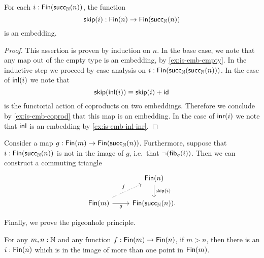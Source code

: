 \begin{lem}
  For each $i:\mathsf{Fin}(\mathsf{succ}_{{\mathbb{N}}}(n))$, the function
  \begin{equation*}
    \mathsf{skip}(i):\mathsf{Fin}(n)\to\mathsf{Fin}(\mathsf{succ}_{{\mathbb{N}}}(n))
  \end{equation*}
  is an embedding.
\end{lem}

\begin{proof}
  This assertion is proven by induction on $n$. In the base case, we note that any map out of the empty type is an embedding, by \cref{ex:is-emb-empty}. In the inductive step we proceed by case analysis on $i:\mathsf{Fin}(\mathsf{succ}_{{\mathbb{N}}}(\mathsf{succ}_{{\mathbb{N}}}(n)))$. In the case of ${\mathsf{inl}}(i)$ we note that
  \begin{equation*}
    \mathsf{skip}({\mathsf{inl}}(i))\equiv \mathsf{skip}(i)+\mathsf{id}_{}
  \end{equation*}
  is the functorial action of coproducts on two embeddings. Therefore we conclude by \cref{ex:is-emb-coprod} that this map is an embedding. In the case of ${\mathsf{inr}}(i)$ we note that ${\mathsf{inl}}$ is an embedding by \cref{ex:is-emb-inl-inr}.
\end{proof}

\begin{lem}
  Consider a map $g:\mathsf{Fin}(m)\to\mathsf{Fin}(\mathsf{succ}_{{\mathbb{N}}}(n))$. Furthermore, suppose that $i:\mathsf{Fin}(\mathsf{succ}_{{\mathbb{N}}}(n))$ is not in the image of $g$, i.e.~that $\neg(\mathsf{fib}_{g}(i))$. Then we can construct a commuting triangle
  \begin{equation*}
    \begin{tikzcd}
      & \Fin(n) \arrow[d,"\skipfun(i)"] \\
      \Fin(m) \arrow[r,swap,"g"] \arrow[ur,densely dotted,"f"] & \Fin(\succN(n)).
    \end{tikzcd}
  \end{equation*}
\end{lem}

Finally, we prove the pigeonhole principle.

\begin{thm}\label{thm:pigeonhole}
  For any $m,n:{\mathbb{N}}$ and any function $f:\mathsf{Fin}(m)\to\mathsf{Fin}(n)$, if $m>n$, then there is an $i:\mathsf{Fin}(n)$ which is in the image of more than one point in $\mathsf{Fin}(m)$.
\end{thm}

